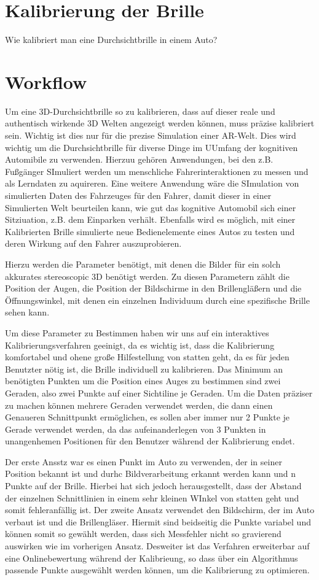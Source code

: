 \section{Kalibrierung der Brille}

Wie kalibriert man eine Durchsichtbrille in einem Auto?

\section{Workflow}
    Um eine 3D-Durchsichtbrille so zu kalibrieren, dass auf dieser reale und authentisch wirkende 3D Welten angezeigt werden können, muss präzise kalibriert sein. Wichtig ist dies nur für die prezise Simulation einer AR-Welt. Dies wird wichtig um die Durchsichtbrille für diverse Dinge im UUmfang der kognitiven Automibile zu verwenden. Hierzuu gehören Anwendungen, bei den z.B. Fußgänger SImuliert werden um menschliche Fahrerinteraktionen zu messen und als Lerndaten zu aquireren. Eine weitere Anwendung wäre die SImulation von simulierten Daten des Fahrzeuges für den Fahrer, damit dieser in einer Simulierten Welt beurteilen kann, wie gut das kognitive Automobil sich einer Sitziuation, z.B. dem Einparken verhält. Ebenfalls wird es möglich, mit einer Kalibrierten Brille simulierte neue Bedienelemente eines Autos zu testen und deren Wirkung auf den Fahrer auszuprobieren.

    Hierzu werden die Parameter benötigt, mit denen die Bilder für ein solch akkurates stereoscopic 3D benötigt werden. Zu diesen Parametern zählt die Position der Augen, die Position der Bildschirme in den Brillengläßern und die Öffnungswinkel, mit denen ein einzelnen Individuum durch eine spezifische Brille sehen kann.

    Um diese Parameter zu Bestimmen haben wir uns auf ein interaktives Kalibrierungsverfahren geeinigt, da es wichtig ist, dass die Kalibrierung komfortabel und ohene große Hilfestellung von statten geht, da es für jeden Benutzter nötig ist, die Brille individuell zu kalibrieren. Das Minimum an benötigten Punkten um die Position eines Auges zu bestimmen sind zwei Geraden, also zwei Punkte auf einer Sichtiline je Geraden. Um die Daten präziser zu machen können mehrere Geraden verwendet werden, die dann einen Genaueren Schnittpunkt ermöglichen, es sollen aber immer nur 2 Punkte je Gerade verwendet werden, da das aufeinanderlegen von 3 Punkten in unangenhemen Positionen für den Benutzer während der Kalibrierung endet.

    Der erste Ansstz war es einen Punkt im Auto zu verwenden, der in seiner Position bekannt ist und durhc Bildverarbeitung erkannt werden kann und n Punkte auf der Brille. Hierbei hat sich jedoch herausgestellt, dass der Abstand der einzelnen Schnittlinien in einem sehr kleinen WInkel von statten geht und somit fehleranfällig ist. Der zweite Ansatz verwendet den Bildschirm, der im Auto verbaut ist und die Brillengläser. Hiermit sind beidseitig die Punkte variabel und können somit so gewählt werden, dass sich Messfehler nicht so gravierend auswirken wie im vorherigen Ansatz. Desweiter ist das Verfahren erweiterbar auf eine Onlinebewertung während der Kalibrieung, so dass über ein Algorithmus passende Punkte ausgewählt werden können, um die Kalibrierung zu optimieren.

